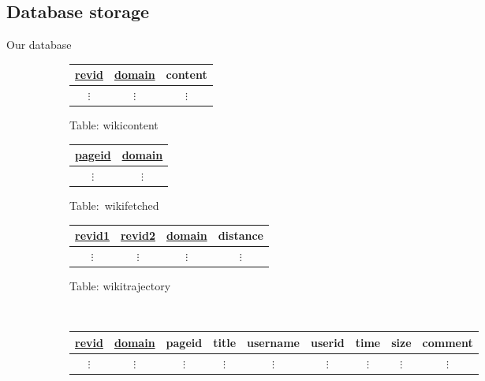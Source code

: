 \documentclass[t]{beamer}
\begin{document}
\subsection{Database storage}
\begin{frame}[fragile]{Our database}
\begin{figure}[b]
  \tiny
  \centering
  \begin{subfigure}[t]{0.3\linewidth}
    \centering
    \begin{tabular}{ccc}
      \toprule
      \underline{revid} & \underline{domain} & content\\
      \midrule
      $\vdots$ & $\vdots$ & $\vdots$\\
    \end{tabular}
    \caption{\tiny Table: wikicontent}
  \end{subfigure}
  \hspace{2mm}
  \begin{subfigure}[t]{0.2\linewidth}
    \centering
    \begin{tabular}{cc}
      \toprule
      \underline{pageid} & \underline{domain} \\
      \midrule
      $\vdots$ & $\vdots$\\
    \end{tabular}
    \caption{\tiny Table:~wikifetched}
  \end{subfigure}
  \hspace{2mm}
  \begin{subfigure}[t]{0.4\linewidth}
    \centering
    \begin{tabular}{cccc}
      \toprule
      \underline{revid1} & \underline{revid2} & \underline{domain} & distance\\
      \midrule
      $\vdots$ & $\vdots$ & $\vdots$ & $\vdots$ \\
    \end{tabular}
    \caption{\tiny Table: wikitrajectory}
  \end{subfigure}\\
  \vspace{2mm}
  \begin{subfigure}[b!]{\linewidth}
    \centering
    \begin{tabular}{ccccccccc}
      \toprule
      \underline{revid} & \underline{domain} & pageid & title & username & userid & time & size &
      comment \\ 
      \midrule
      $\vdots$ & $\vdots$ & $\vdots$ & $\vdots$ & $\vdots$ & $\vdots$ & $\vdots$
      & $\vdots$ & $\vdots$ \\

\end{tabular}
\end{subfigure}
\end{figure}
\end{frame}
\end{document}
